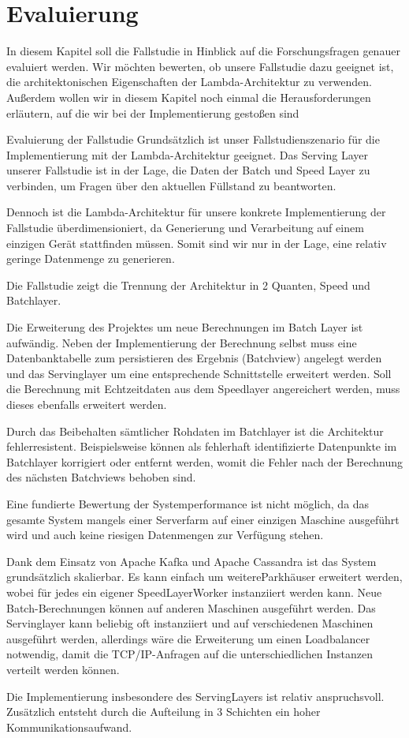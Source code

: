 \chapter{Evaluierung}
In diesem Kapitel soll die Fallstudie in Hinblick auf die Forschungsfragen genauer evaluiert werden. Wir möchten bewerten, ob unsere Fallstudie dazu geeignet ist, die architektonischen Eigenschaften der Lambda-Architektur zu verwenden. Außerdem wollen wir in diesem Kapitel noch einmal die Herausforderungen erläutern, auf die wir bei der Implementierung gestoßen sind

Evaluierung der Fallstudie
Grundsätzlich ist unser Fallstudienszenario für die Implementierung mit der Lambda-Architektur geeignet. Das Serving Layer unserer Fallstudie ist in der Lage, die Daten der Batch und Speed Layer zu verbinden, um Fragen über den aktuellen Füllstand zu beantworten. 

Dennoch ist die Lambda-Architektur für unsere konkrete Implementierung der Fallstudie überdimensioniert, da Generierung und Verarbeitung auf einem einzigen Gerät stattfinden müssen. Somit sind wir nur in der Lage, eine relativ geringe Datenmenge zu generieren.

Die Fallstudie zeigt die Trennung der Architektur in 2 Quanten, Speed und Batchlayer. 

Die Erweiterung des Projektes um neue Berechnungen im Batch Layer ist aufwändig. 
Neben der Implementierung der Berechnung selbst muss eine Datenbanktabelle zum persistieren des Ergebnis (Batchview) angelegt werden
und  das Servinglayer um eine entsprechende Schnittstelle erweitert werden.
Soll die Berechnung mit Echtzeitdaten aus dem Speedlayer angereichert werden, muss dieses ebenfalls erweitert werden.

Durch das Beibehalten sämtlicher Rohdaten im Batchlayer ist die Architektur fehlerresistent. 
Beispielsweise können als fehlerhaft identifizierte Datenpunkte im Batchlayer korrigiert oder entfernt werden,
womit die Fehler nach der Berechnung des nächsten Batchviews behoben sind.

Eine fundierte Bewertung der Systemperformance ist nicht möglich, da das gesamte System mangels einer Serverfarm auf einer einzigen Maschine ausgeführt wird und auch keine riesigen Datenmengen zur Verfügung stehen.

Dank dem Einsatz von Apache Kafka und Apache Cassandra ist das System grundsätzlich skalierbar.
Es kann einfach um weitereParkhäuser erweitert werden,
wobei für jedes ein eigener SpeedLayerWorker instanziiert werden kann.
Neue Batch-Berechnungen können auf anderen Maschinen ausgeführt werden.
Das Servinglayer kann beliebig oft instanziiert und auf verschiedenen Maschinen ausgeführt werden,
allerdings wäre die Erweiterung um einen Loadbalancer notwendig,
damit die TCP/IP-Anfragen auf die unterschiedlichen Instanzen verteilt werden können.

Die Implementierung insbesondere des ServingLayers ist relativ anspruchsvoll.
Zusätzlich entsteht durch die Aufteilung in 3 Schichten ein hoher Kommunikationsaufwand.
